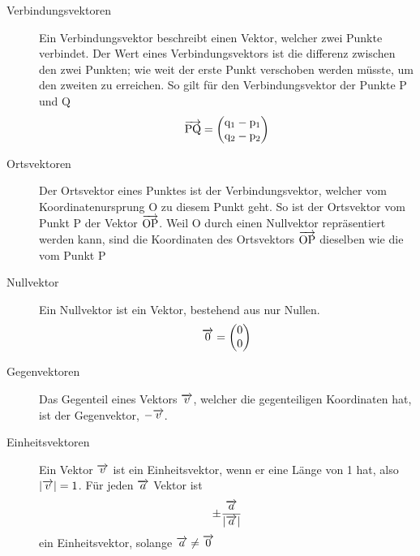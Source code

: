 \documentclass{article}
\begin{document}
\vspace{1em} 
\noindent \begin{minipage}{\dimexpr\textwidth-5cm}
 \begin{description}
  \item[Verbindungsvektoren] Ein Verbindungsvektor beschreibt einen Vektor, welcher zwei Punkte verbindet. Der Wert eines Verbindungsvektors ist die differenz zwischen den zwei Punkten; wie weit der erste Punkt verschoben werden müsste, um den zweiten zu erreichen. So gilt für den Verbindungsvektor der Punkte $\mathrm{P}$ und $\mathrm{Q}$
\[
 \overrightarrow{\mathrm{PQ}} =
 \begin{pmatrix}
  \mathrm{q}_1 - \mathrm{p}_1 \\
  \mathrm{q}_2 - \mathrm{p}_2
 \end{pmatrix}
\] 
 \end{description} 
\end{minipage}
\hfill
\begin{minipage}{5cm}
  \centering
\end{minipage} 
\begin{description} 
 \item[Ortsvektoren] Der Ortsvektor eines Punktes ist der Verbindungsvektor, welcher vom Koordinatenursprung $\mathrm{O}$ zu diesem Punkt geht. So ist der Ortsvektor vom Punkt $\mathrm{P}$ der Vektor $\overrightarrow{\mathrm{OP}}$. Weil $\mathrm{O}$ durch einen Nullvektor repräsentiert werden kann, sind die Koordinaten des Ortsvektors $\overrightarrow{\mathrm{OP}}$ dieselben wie die vom Punkt $\mathrm{P}$
  \item[Nullvektor] Ein Nullvektor ist ein Vektor, bestehend aus nur Nullen.
\[
 \overrightarrow{0} = \begin{pmatrix} 0 \\ 0 \end{pmatrix}
\] 
 \item[Gegenvektoren] Das Gegenteil eines Vektors $\overrightarrow{v}$, welcher die gegenteiligen Koordinaten hat, ist der Gegenvektor, $-\overrightarrow{v}$.
 \item[Einheitsvektoren] Ein Vektor $\overrightarrow{v}$ ist ein Einheitsvektor, wenn er eine Länge von 1 hat, also $\left| {\overrightarrow{v}} \right| = 1$. Für jeden $\overrightarrow{a}$ Vektor ist
\[
 \pm \frac{\overrightarrow{a}}{\left| {\overrightarrow{a}} \right|} 
\]
ein Einheitsvektor, solange $\overrightarrow{a} \neq \overrightarrow{0}$
\end{description} 
 
\end{document}
